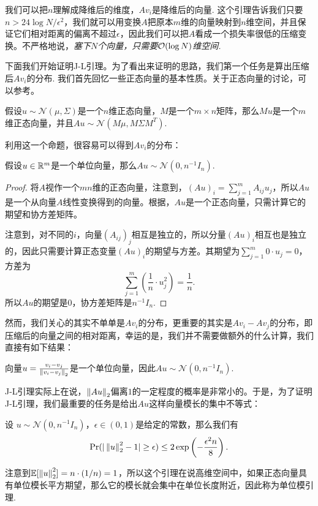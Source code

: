 我们可以把$n$理解成降维后的维度，$Av_i$是降维后的向量. 这个引理告诉我们只要$n > 24\log N/\epsilon^2$，我们就可以用变换$A$把原本$m$维的向量映射到$n$维空间，并且保证它们相对距离的偏离不超过$\epsilon$，因此我们可以把$A$看成一个损失率很低的压缩变换。不严格地说，\emph{塞下$N$个向量，只需要$\mathcal{O}(\log N)$维空间.}

下面我们开始证明J-L引理。为了看出来证明的思路，我们第一个任务是算出压缩后$Av_i$的分布. 我们首先回忆一些正态向量的基本性质。关于正态向量的讨论，可以参考。

\begin{proposition}\label{prop:gaussian-vector}
假设$u\sim\mathcal N(\mu,\Sigma)$是一个$n$维正态向量，$M$是一个$m\times n$矩阵，那么$Mu$是一个$m$维正态向量，并且$Au\sim \mathcal N(M\mu,M\Sigma M^T)$.
\end{proposition}

利用这一个命题，很容易可以得到$Av_i$的分布：

\begin{lemma}\label{lemma:gaussian-vector}
    假设$u\in\mathbb{R}^m$是一个单位向量，那么$Au\sim \mathcal N(0,n^{-1}I_n)$.
\end{lemma}
\begin{proof}
    将$A$视作一个$mn$维的正态向量，注意到，$(Au)_i = \sum_{j=1}^m A_{ij}u_j$，所以$Au$是一个从向量$A$线性变换得到的向量。根据，$Au$是一个正态向量，只需计算它的期望和协方差矩阵。
   
   注意到，对不同的$i$，向量$(A_{ij})_{j}$相互是独立的，所以分量$(Au)_i$相互也是独立的，因此只需要计算正态变量$(Au)_i$的期望与方差。其期望为$\sum_{j=1}^m 0\cdot u_j = 0$，方差为
   \[\sum_{j=1}^m \left(\frac{1}{n}\cdot u_j^2\right) = \frac{1}{n}.\] 
   所以$Au$的期望是$0$，协方差矩阵是$n^{-1}I_n$.
\end{proof}

然而，我们关心的其实不单单是$Av_i$的分布，更重要的其实是$Av_i-Av_j$的分布，即压缩后的向量之间的相对距离，幸运的是，我们并不需要做额外的什么计算，我们直接有如下结果：

\begin{lemma}\label{lemma:gaussian-vector-diff}
    向量$u=\frac{v_i-v_j}{\left\|v_i-v_j\right\|_2}$是一个单位向量，因此$Au\sim \mathcal N(0,n^{-1}I_n)$.
\end{lemma}

J-L引理实际上在说，$\left\|Au\right\|_2$偏离$1$的一定程度的概率是非常小的。于是，为了证明J-L引理，我们最重要的任务是给出$Au$这样向量模长的集中不等式：
\begin{lemma}[单位模引理]\label{lemma:unit-mod-lemma}
    设 $u\sim \mathcal N(0,n^{-1}I_n)$，$\epsilon \in (0,1 )$是给定的常数，那么我们有
    \[
        \Pr(|\left\|u\right\|_2^2 - 1| \geq \epsilon) \leq 2\exp \left(-\frac{\epsilon^2 n}{8}\right).
    \]
\end{lemma}
注意到$\mathbb{E}[\left\|u\right\|_2^2]=n\cdot(1/n)=1$，所以这个引理在说高维空间中，如果正态向量具有单位模长平方期望，那么它的模长就会集中在单位长度附近，因此称为单位模引理.

